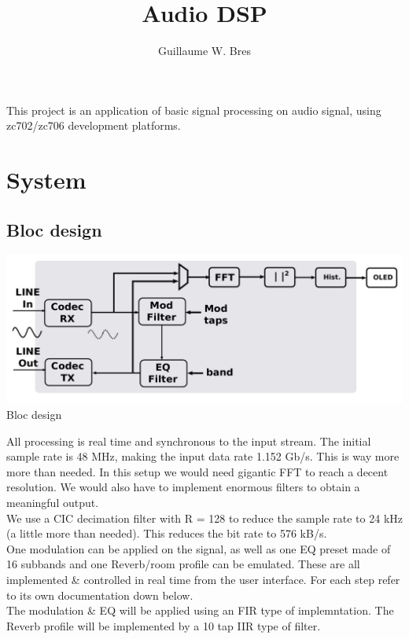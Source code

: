 \documentclass{article}
\author{Guillaume W. Bres}
\title{Audio DSP}
\begin{document}
\maketitle

This project is an application of basic
signal processing on audio signal,
using zc702/zc706 development platforms.

\tableofcontents

\newpage
\section{System}


\subsection{Bloc design}

\begin{center}
	\includegraphics[width=0.75\linewidth]{bloc_design.pdf} \\
	Bloc design
\end{center}

All processing is real time and synchronous to the input
stream. The initial sample rate is 48 MHz, making the
input data rate 1.152 Gb/s. This is way more more than needed.
In this setup we would need gigantic FFT to reach a decent
resolution. We would also have to implement enormous filters
to obtain a meaningful output. \\

We use a CIC decimation filter with R = 128
to reduce the sample rate to 24 kHz (a little more than needed).
This reduces the bit rate to 576 kB/s. \\

One modulation can be applied on the signal,
as well as one EQ preset made of 16 subbands and
one Reverb/room profile can be emulated.
These are all implemented 
\& controlled in real time from the user interface.
For each step refer to its own documentation down below. \\

The modulation \& EQ will be applied using an FIR type
of implemntation. The Reverb profile will be implemented
by a 10 tap IIR type of filter. \\
\end{document}
